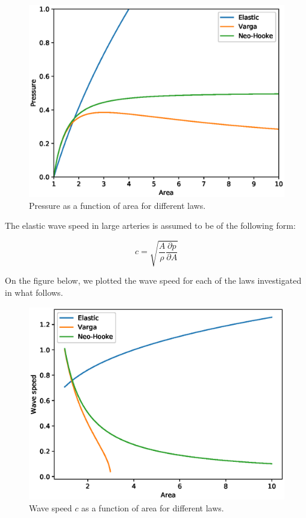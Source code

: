 \documentclass{config}
\begin{document}
\begin{figure}[H]
\begin{center}
\includegraphics[scale=0.6]{figures/p_A.eps}
\caption{Pressure as a function of area for different laws.}
\label{p_A}
\end{center}
\end{figure}

The elastic wave speed in large arteries is assumed to be of the following form:

\begin{equation}\label{def_c}
c = \sqrt{\frac{A}{\rho} \frac{\partial p}{\partial A}}
\end{equation} 

On the figure below, we plotted the wave speed for each of the laws investigated in what follows. 

\begin{figure}[H]
\begin{center}
\includegraphics[scale=0.6]{figures/c_A.eps}
\caption{Wave speed $c$ as a function of area for different laws.}
\label{c_a}
\end{center}
\end{figure}
\end{document}
